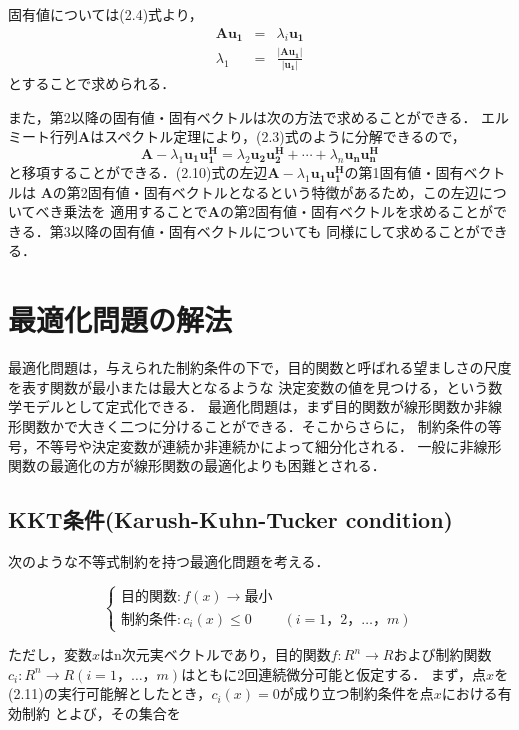 固有値については(2.4)式より，
\begin{eqnarray}
    \bm{Au_1}&=&\lambda_i\bm{u_1} \nonumber \\
    \lambda_1&=&\frac{\left| \bm{Au_1} \right|}{\left| \bm{u_1} \right|}
\end{eqnarray}
とすることで求められる．

また，第2以降の固有値・固有ベクトルは次の方法で求めることができる．
エルミート行列$\bm{A}$はスペクトル定理により，(2.3)式のように分解できるので，
\begin{equation}
    \bm{A} - \lambda_1\bm{u_1}\bm{u_1^H} = \lambda_2\bm{u_2}\bm{u_2^H} + \cdots + \lambda_n\bm{u_n}\bm{u_n^H}
\end{equation}
と移項することができる．(2.10)式の左辺$\bm{A} - \lambda_1\bm{u_1}\bm{u_1^H}$の第1固有値・固有ベクトルは
$\bm{A}$の第2固有値・固有ベクトルとなるという特徴があるため，この左辺についてべき乗法を
適用することで$\bm{A}$の第2固有値・固有ベクトルを求めることができる．第3以降の固有値・固有ベクトルについても
同様にして求めることができる．

\section{最適化問題の解法}
最適化問題は，与えられた制約条件の下で，目的関数と呼ばれる望ましさの尺度を表す関数が最小または最大となるような
決定変数の値を見つける，という数学モデルとして定式化できる． \cite{ibaragi}
最適化問題は，まず目的関数が線形関数か非線形関数かで大きく二つに分けることができる．そこからさらに，
制約条件の等号，不等号や決定変数が連続か非連続かによって細分化される．
一般に非線形関数の最適化の方が線形関数の最適化よりも困難とされる．

\subsection{KKT条件(Karush-Kuhn-Tucker condition)}
次のような不等式制約を持つ最適化問題を考える．

\begin{equation}
    \left\{
        \begin{array}{cc}
            目的関数:f(x) \to 最小 & \\
            制約条件:c_i(x) \leq 0 & (i=1，2，\ldots，m)
        \end{array}
    \right.
\end{equation}

ただし，変数$x$はn次元実ベクトルであり，目的関数$f:R^n \to R$および制約関数
$c_i:R^n \to R(i=1，\ldots，m)$はともに2回連続微分可能と仮定する．
まず，点$x$を(2.11)の実行可能解としたとき，$c_i(x)=0$が成り立つ制約条件を点$x$における有効制約
とよび，その集合を


